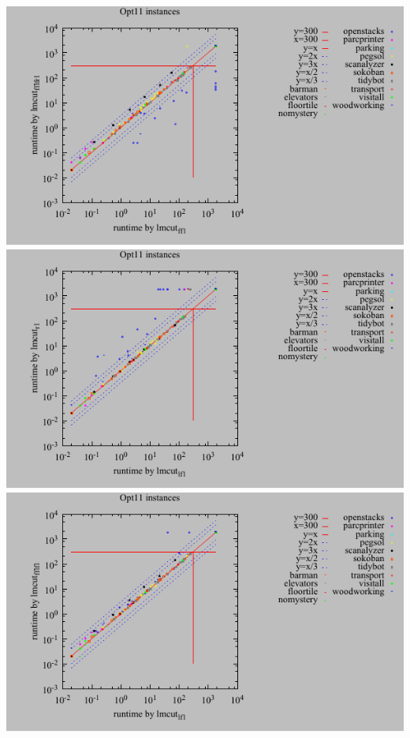 \includegraphics{tables/opt11-time-lmcut_ff-lmcut_fflfr.pdf}
\linebreak
\includegraphics{tables/opt11-time-lmcut_lf-lmcut_r.pdf}
\linebreak
\includegraphics{tables/opt11-time-lmcut_lf-lmcut_fflf.pdf}
\linebreak
